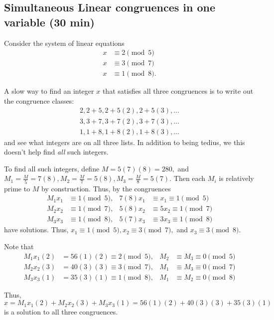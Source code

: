 \documentclass{../ximera}
\begin{document}
\subsection{Simultaneous Linear congruences in one variable (30 min)}


\begin{example}
    Consider the system of linear equations 
    \begin{align*}
        x &\equiv 2 \pmod{5}\\
        x &\equiv 3 \pmod{7}\\
        x &\equiv 1 \pmod{8}.
    \end{align*}

    A slow way to find an integer $x$ that satisfies all three congruences is to write out the congruence classes:
    \begin{align*}
        2, 2+5, 2+5(2), \boxed{2+5(3)}, \dots\\
        3, 3+7, \boxed{3+7(2)}, 3+7(3), \dots\\
        1, 1+8, 1+8(2), \boxed{1+8(3)}, \dots
    \end{align*}
    and see what integers are on all three lists. In addition to being tedius, we this doesn't help find \emph{all} such integers.

    To find all such integers, define $M=5(7)(8)=280,$ and $M_1=\frac{M}{5}=7(8),M_2=\frac{M}{7}=5(8),M_3=\frac{M}{8}=5(7).$ Then each $M_i$ is relatively prime to $M$ by construction. Thus, by  the congruences
    \begin{align*}
        M_1x_1 & \equiv 1\pmod 5, & 7(8)x_1&\equiv x_1 \equiv 1\pmod 5\\
        M_2x_2 & \equiv 1\pmod 7, & 5(8)x_2 &\equiv 5x_2 \equiv 1\pmod 7\\
        M_3x_3 & \equiv 1\pmod 8, & 5(7)x_3&\equiv 3x_3\equiv 1\pmod 8
    \end{align*}
    have solutions. Thus, $x_1\equiv 1\pmod{5}, x_2\equiv 3\pmod{7},$ and $x_3\equiv 3\pmod{8}.$

    Note that 
    \begin{align*}
        M_1x_1(2)&=56(1)(2)\equiv 2\pmod 5, & M_2&\equiv M_3\equiv 0\pmod{5}\\
        M_2x_2(3)&=40(3)(3)\equiv 3\pmod 7, & M_1&\equiv M_3\equiv 0\pmod{7}\\
        M_3x_3(1)&=35(3)(1)\equiv 1\pmod 8, & M_1&\equiv M_2\equiv 0\pmod{8}
    \end{align*}

    Thus, \[x=M_1x_1(2)+M_2x_2(3)+M_3x_3(1)=56(1)(2)+40(3)(3)+35(3)(1)\]
    is a solution to all three congruences.
\end{example}
\end{document}

